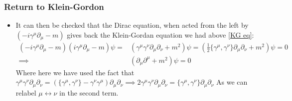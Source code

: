 \documentclass[11pt]{article}
\numberwithin{equation}{section}
\begin{document}
\subsubsection{Return to Klein-Gordon}
\begin{itemize}
\item It can then be checked that the Dirac equation, when acted from the left by $(-i\gamma^{\mu}\partial_{\mu}-m)$ gives back the Klein-Gordan equation we had above \ref{KG eq}:
\begin{align*}
  (-i\gamma^{\mu}\partial_{\mu}-m)(i\gamma^{\mu}\partial_{\mu}-m)\psi  = &(\gamma^{\mu}\gamma^{\nu}\partial_{\mu}\partial_{\nu}+m^2)\psi = (\frac{1}{2}\{\gamma^{\mu},\gamma^{\nu}\}\partial_{\mu}\partial_{\nu}+m^2)\psi = 0\\
  \implies & (\partial_{\mu}\partial^{\mu}+m^2)\psi = 0 
\end{align*}
Where here we have used the fact that $\gamma^{\mu}\gamma^{\nu}\partial_{\mu}\partial_{\nu} = (\{\gamma^{\mu},\gamma^{\nu}\}-\gamma^{\nu}\gamma^{\mu})\partial_{\mu}\partial_{\nu}\implies 2\gamma^{\mu}\gamma^{\nu}\partial_{\mu}\partial_{\nu} = \{\gamma^{\mu},\gamma^{\nu}\}\partial_{\mu}\partial_{\nu}$ As we can relabel $\mu \leftrightarrow \nu$ in the second term. 

\end{itemize}
\end{document}
